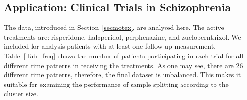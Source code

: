\documentclass[11pt,a5paper,twoside]{book}
\begin{document}
\subsection{Application: Clinical Trials in Schizophrenia}\label{secapp}

The data, introduced in Section~\ref{secmotex}, are analysed here. The active treatments are: risperidone, haloperidol, perphenazine, and zuclopernthixol. We included for analysis patients with at least one follow-up measurement. Table~\ref{Tab_freq} shows the number of patients participating in each trial for all different time patterns in receiving the treatments. As one may see, there are 26 different time patterns, therefore, the final dataset is unbalanced. This makes it suitable for examining the performance of sample splitting according to the cluster size.
\end{document}
